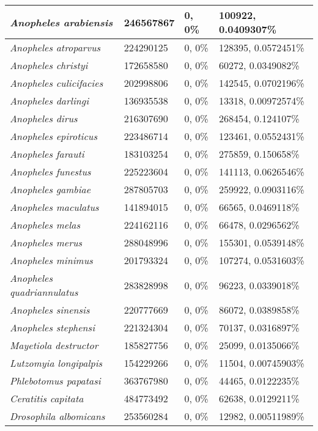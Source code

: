 {\begin{longtable}{| L{4cm} | L{2.7cm}  | L{3.7cm} | L{3.7cm} |}
\textit{Anopheles arabiensis} & 246567867 & 0, 0\% & 100922, 0.0409307\% \\ \hline
\textit{Anopheles atroparvus} & 224290125 & 0, 0\% & 128395, 0.0572451\% \\ \hline
\textit{Anopheles christyi} & 172658580 & 0, 0\% & 60272, 0.0349082\% \\ \hline
\textit{Anopheles culicifacies} & 202998806 & 0, 0\% & 142545, 0.0702196\% \\ \hline
\textit{Anopheles darlingi} & 136935538 & 0, 0\% & 13318, 0.00972574\% \\ \hline
\textit{Anopheles dirus} & 216307690 & 0, 0\% & 268454, 0.124107\% \\ \hline
\textit{Anopheles epiroticus} & 223486714 & 0, 0\% & 123461, 0.0552431\% \\ \hline
\textit{Anopheles farauti} & 183103254 & 0, 0\% & 275859, 0.150658\% \\ \hline
\textit{Anopheles funestus} & 225223604 & 0, 0\% & 141113, 0.0626546\% \\ \hline
\textit{Anopheles gambiae} & 287805703 & 0, 0\% & 259922, 0.0903116\% \\ \hline
\textit{Anopheles maculatus} & 141894015 & 0, 0\% & 66565, 0.0469118\% \\ \hline
\textit{Anopheles melas} & 224162116 & 0, 0\% & 66478, 0.0296562\% \\ \hline
\textit{Anopheles merus} & 288048996 & 0, 0\% & 155301, 0.0539148\% \\ \hline
\textit{Anopheles minimus} & 201793324 & 0, 0\% & 107274, 0.0531603\% \\ \hline
\textit{Anopheles quadriannulatus} & 283828998 & 0, 0\% & 96223, 0.0339018\% \\ \hline
\textit{Anopheles sinensis} & 220777669 & 0, 0\% & 86072, 0.0389858\% \\ \hline
\textit{Anopheles stephensi} & 221324304 & 0, 0\% & 70137, 0.0316897\% \\ \hline
\textit{Mayetiola destructor} & 185827756 & 0, 0\% & 25099, 0.0135066\% \\ \hline
\textit{Lutzomyia longipalpis} & 154229266 & 0, 0\% & 11504, 0.00745903\% \\ \hline
\textit{Phlebotomus papatasi} & 363767980 & 0, 0\% & 44465, 0.0122235\% \\ \hline
\textit{Ceratitis capitata} & 484773492 & 0, 0\% & 62638, 0.0129211\% \\ \hline
\textit{Drosophila albomicans} & 253560284 & 0, 0\% & 12982, 0.00511989\% \\ \hline

\end{longtable}}
